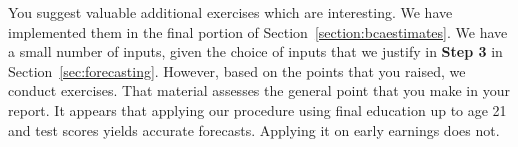 You suggest valuable additional exercises which are interesting. We have implemented them in the final portion of Section~\ref{section:bcaestimates}. We have a small number of inputs, given the choice of inputs that we justify in \textbf{Step 3} in Section~\ref{sec:forecasting}. However, based on the points that you raised, we conduct exercises. That material assesses the general point that you make in your report. It appears that applying our procedure using final education up to age 21 and test scores yields accurate forecasts. Applying it on early earnings does not.



